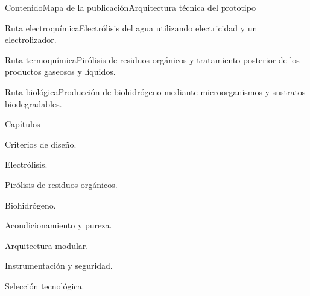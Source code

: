 \documentclass{../plantilla/hvtbook}
\begin{document}
\HVTMakeTitle

\begin{HVTPage}{Contenido}{Mapa de la publicación}{Arquitectura técnica del prototipo}
\begin{HVTGrid}
\begin{HVTColumn}{Ruta electroquímica}Electrólisis del agua utilizando electricidad y un electrolizador.\end{HVTColumn}
\begin{HVTColumn}{Ruta termoquímica}Pirólisis de residuos orgánicos y tratamiento posterior de los productos gaseosos y líquidos.\end{HVTColumn}
\begin{HVTColumn}{Ruta biológica}Producción de biohidrógeno mediante microorganismos y sustratos biodegradables.\end{HVTColumn}
\end{HVTGrid}
\begin{HVTTaskOrdered}{Capítulos}\item Criterios de diseño. \item Electrólisis. \item Pirólisis de residuos orgánicos. \item Biohidrógeno. \item Acondicionamiento y pureza. \item Arquitectura modular. \item Instrumentación y seguridad. \item Selección tecnológica.\end{HVTTaskOrdered}
\end{HVTPage}
\end{document}
